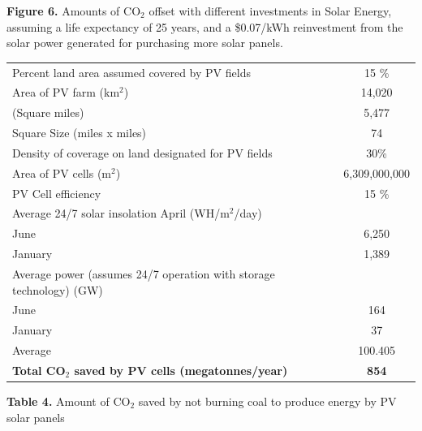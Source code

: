 \documentclass[12pt]{article}
\begin{document}
\begin{center}
{\bf Figure 6.} Amounts of CO$_2$ offset with different investments in Solar Energy, assuming a life expectancy of 25 years, and a \$0.07/kWh reinvestment from the solar power generated for purchasing more solar panels.  
\end{center}

\begin{center}
\begin{tabular}{|l|c|}
\hline
\cellcolor[gray]{0.8}{\bf Description} & \cellcolor[gray]{0.8}{\bf Value} \\
\hline
Percent land area assumed covered by PV fields & 15 \% \\ 
\hline
Area of PV farm (km$^2$) & 14,020 \\
\hline
\hspace{24.5em} (Square miles) & 5,477 \\
\hline
\hspace{19em} Square Size (miles x miles) & 74 \\
\hline
Density of coverage on land designated  for PV fields & 30\% \\
\hline
Area of PV cells (m$^2$) &  6,309,000,000 \\ 
\hline
PV Cell efficiency & 15 \% \\
\hline
Average 24/7 solar insolation April (WH/m$^2$/day) &  \\
\hline
\hspace{29.5em}June & 6,250 \\
\hline
\hspace{28em}January & 1,389 \\
\hline
Average power (assumes 24/7 operation with storage technology) (GW) & \\
\hline
\hspace{29.5em}June & 164 \\
\hline
\hspace{28em}January & 37 \\
\hline
\hspace{28em}Average & 100.405 \\
\hline  
{\bf Total CO$_2$ saved by PV cells (megatonnes/year)} & {\bf 854} \\
\hline
\end{tabular}
\end{center}

\begin{center}
{\bf Table 4.} Amount of CO$_2$ saved by not burning coal to produce energy by PV solar panels
\end{center}
\end{document}
